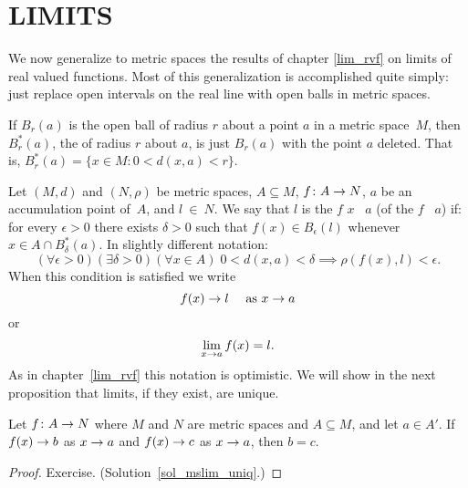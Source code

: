 \section{LIMITS}
We now generalize to metric spaces the results of chapter \ref{lim_rvf} on limits of real
valued functions.  Most of this generalization is accomplished quite simply: just replace open
intervals on the real line with open balls in metric spaces.

\begin{defn} If $B_r(a)$ is the open ball of radius $r$ about a point $a$ in a metric space~$M$,
then $B_r^*(a)$, the
 of radius $r$ about $a$, is just $B_r(a)$ with the point $a$ deleted.  That
is, $B_r^*(a) = \{x \in M\colon  0 < d(x,a) < r\}$.
\end{defn}

\begin{defn} Let $(M,d)$ and $(N,\rho)$ be metric spaces, $A \subseteq M$, $f\colon A \rightarrow N$,
$a$ be an accumulation point of~$A$, and $l~\in~N$.  We say that $l$ is the
 $f$  $x$ ~$a$ (of the  $f$ ~$a$) if:
for every $\epsilon > 0$ there exists $\delta > 0$ such that $f(x) \in B_\epsilon(l)$ whenever
$x \in A \cap B_\delta^*(a)$.  In slightly different notation:
  \[(\forall \epsilon > 0)(\exists \delta > 0)(\forall x \in A)\;
        0 < d(x,a) < \delta \implies \rho(f(x),l) < \epsilon.\]
When this condition is satisfied we write
  \[f(x) \rightarrow l \quad \text{ as } x \rightarrow a\]
or
  \[\lim_{x \rightarrow a}f(x) = l.\]
As in chapter~\ref{lim_rvf} this notation is optimistic.  We will show in the next proposition that
limits, if they exist, are unique.
\end{defn}

\begin{prop}\label{mslim_uniq} Let $f\colon A \rightarrow N$ where $M$ and $N$ are metric spaces and
$A \subseteq M$, and let $a \in A'$.  If $f(x) \rightarrow b$ as $x \rightarrow a$ and $f(x) \rightarrow c$ as $x \rightarrow
a$, then $b = c$.
\end{prop}

\begin{proof} Exercise.    (Solution~\ref{sol_mslim_uniq}.)   \ns  \end{proof}

